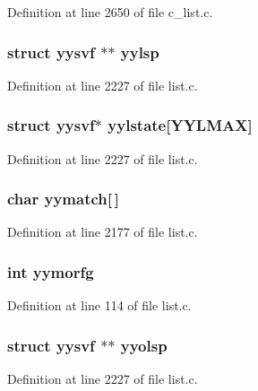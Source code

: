Definition at line 2650 of file c\_\-list.c.
\subsubsection{\setlength{\rightskip}{0pt plus 5cm}struct \bf{yysvf} $\ast$$\ast$ \bf{yylsp}}\label{list_8c_73a1886259f2d6f6fb1e493c9775adf5}




Definition at line 2227 of file list.c.
\subsubsection{\setlength{\rightskip}{0pt plus 5cm}struct \bf{yysvf}$\ast$ \bf{yylstate}[YYLMAX]}\label{list_8c_d22325dc0887c43d7e63b21ad8659e6a}




Definition at line 2227 of file list.c.
\subsubsection{\setlength{\rightskip}{0pt plus 5cm}char \bf{yymatch}[$\,$]}\label{list_8c_8043df7c7db8b5a6a86a6e34340d8d86}




Definition at line 2177 of file list.c.
\subsubsection{\setlength{\rightskip}{0pt plus 5cm}int \bf{yymorfg}}\label{list_8c_36702dc8caf59c02fba363377b123171}




Definition at line 114 of file list.c.
\subsubsection{\setlength{\rightskip}{0pt plus 5cm}struct \bf{yysvf} $\ast$$\ast$ \bf{yyolsp}}\label{list_8c_ee96721f15c2dbe2efd58f2b9186a801}




Definition at line 2227 of file list.c.
